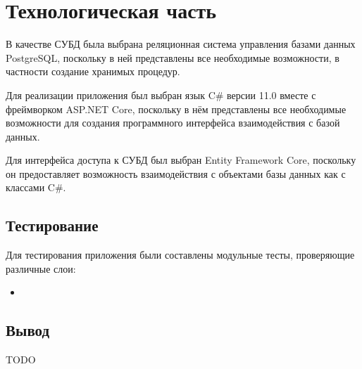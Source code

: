 \chapter{Технологическая часть}

В качестве СУБД была выбрана реляционная система управления базами данных PostgreSQL, поскольку в ней представлены все необходимые возможности, в частности создание хранимых процедур.

Для реализации приложения был выбран язык C\# версии 11.0 вместе с фреймворком ASP.NET Core, поскольку в нём представлены все необходимые возможности для создания программного интерфейса взаимодействия с базой данных.

Для интерфейса доступа к СУБД был выбран Entity Framework Core, поскольку он предоставляет возможность взаимодействия с объектами базы данных как с классами C\#.

\section{Тестирование}

Для тестирования приложения были составлены модульные тесты, проверяющие различные слои:
\begin{itemize}[]
	\item 
\end{itemize}

\section*{Вывод}

TODO

\clearpage
